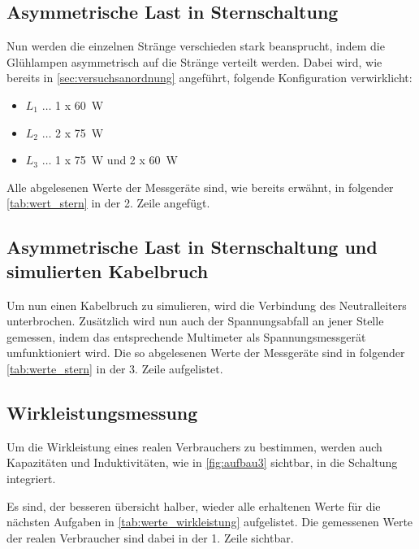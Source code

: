 \documentclass[12pt,english,ngerman]{scrartcl}
\begin{document}
\subsection{Asymmetrische Last in Sternschaltung}\label{sec:vers_asy_stern_ohne}

Nun werden die einzelnen Stränge verschieden stark beansprucht, indem die
Glühlampen asymmetrisch auf die Stränge verteilt werden. Dabei wird, wie
bereits in \autoref{sec:versuchsanordnung} angeführt, folgende Konfiguration
verwirklicht:

\begin{itemize}
	\item $L_1$ \(\dots\) 1 x \SI[]{60}{\watt}
	\item $L_2$ \(\dots\) 2 x \SI[]{75}{\watt}
	\item $L_3$ \(\dots\) 1 x \SI[]{75}{\watt} und 2 x \SI[]{60}{\watt}
\end{itemize}

Alle abgelesenen Werte der Messgeräte sind, wie bereits erwähnt, in folgender
\autoref{tab:wert_stern} in der 2. Zeile angefügt.

\subsection{Asymmetrische Last in Sternschaltung und simulierten Kabelbruch}\label{sec:vers_asy_stern_mit}

Um nun einen Kabelbruch zu simulieren, wird die Verbindung des Neutralleiters
unterbrochen. Zusätzlich wird nun auch der Spannungsabfall an jener Stelle
gemessen, indem das entsprechende Multimeter als Spannungsmessgerät
umfunktioniert wird. Die so abgelesenen Werte der Messgeräte sind in folgender
\autoref{tab:werte_stern} in der 3. Zeile aufgelistet.

\subsection{Wirkleistungsmessung}
Um die Wirkleistung eines realen Verbrauchers zu bestimmen, werden auch
Kapazitäten und Induktivitäten, wie in \autoref{fig:aufbau3} sichtbar, in die
Schaltung integriert.

Es sind, der besseren übersicht halber, wieder alle erhaltenen Werte für die
nächsten Aufgaben in \autoref{tab:werte_wirkleistung} aufgelistet. Die
gemessenen Werte der realen Verbraucher sind dabei in der 1. Zeile sichtbar.
\end{document}
